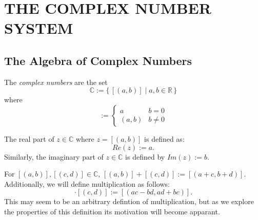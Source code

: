 \documentclass{refbook}
\begin{document}
\section{THE COMPLEX NUMBER SYSTEM}
\subsection{The Algebra of Complex Numbers}
\begin{definition} 
\label{def:cmpnum}
The \emph{complex numbers} are the set
\begin{equation*}
\mathbb{C} := \{\,[(a,b)] \mid a,b \in \mathbb{R}\,\}
\end{equation*}
where
\begin{equation*}
[(a,b)] :=
\begin{cases}
a & b = 0 \\
(a,b) & b \neq 0
\end{cases}
\end{equation*}
\end{definition}
\begin{definition} 
The real part of $z \in \mathbb{C}$ where $z=[(a,b)]$ is defined as:
\begin{equation*}
Re(z) := a.
\end{equation*}
Similarly, the imaginary part of $z \in \mathbb{C}$ is defined by $Im(z):=b$.
\end{definition}
\begin{definition} 
For $[(a,b)],[(c,d)]\in \mathbb{C}$, $[(a,b)]+[(c,d)]:=[(a+c,b+d)]$. Additionally, we will define multiplication as follows:
\begin{equation*}
[(a,b)]\cdot[(c,d)] := [(ac - bd, ad + bc)].
\end{equation*}
This may seem to be an arbitrary defintion of multiplication, but as we explore the properties of this definition its motivation will become apparant.
\end{definition}
\end{document}
